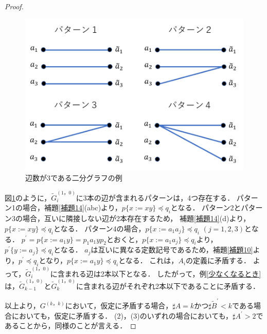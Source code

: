 \begin{proof}
\begin{figure}
\centering
\includegraphics[width=\linewidth]{画像/辺3におけるパターン.png}
\vspace*{-1cm}
\caption{辺数が3である二分グラフの例}
\label{辺3におけるパターン}
\end{figure}

図\ref{辺3におけるパターン}のように，$\tilde{G}^{(1，0)}_{i}$に3本の辺が含まれるパターンは，4つ存在する．
パターン1の場合，補題\ref{補題14}(abc)より，$p \{ x:=xy \} \preceq q_{i}$となる．
パターン2とパターン3の場合，互いに隣接しない辺が2本存在するため，
補題\ref{補題14}(d)より，$p \{ x:=xy \} \preceq q_{i}$となる．
パターン4の場合，$p \{ x:=a_{1}a_{j} \} \preceq q_{i}$ $(j=1,2,3)$となる．
$p^{\prime} = p \{ x:=a_{1}y \} = p_{1}a_{1}yp_{2}$とおくと，$p \{ x:=a_{1}a_{j} \} \preceq q_{i}$より，$p^{\prime} \{ y:=a_{j} \} \preceq q_{i}$となる．
$a_{j}$は互いに異なる定数記号であるため，補題\ref{補題10}より，$p^{\prime} \preceq q_{i}$となり，$p \{ x:=a_{1}y \} \preceq q_{i}$となる．
これは，$A_{i}$の定義に矛盾する．
よって，$\tilde{G}^{(1，0)}_{i}$に含まれる辺は2本以下となる．
したがって，例\ref{少なくなるとき}は，$\tilde{G}^{(1，0)}_{k-1}$と$\tilde{G}^{(1，0)}_{k}$に含まれる辺がそれぞれ2本以下であることに矛盾する．

以上より，$G^{(k，k)}$において，仮定に矛盾する場合，$\sharp A=k$かつ$\sharp \tilde{B}^{\prime} < k$である場合においても，仮定に矛盾する．
(2)，(3)のいずれの場合においても，$\sharp A^{\prime} > 2$であることから，同様のことが言える．


\end{proof}
